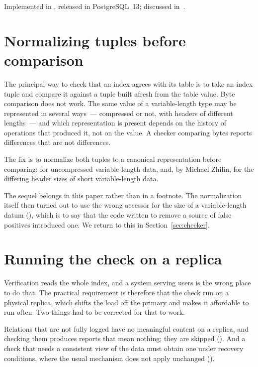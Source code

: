 Implemented in , released in PostgreSQL~13; discussed
in~\cite{thread-rightlink-lockcoupling}.

\section{Normalizing tuples before comparison}
\label{sec:normalize}

The principal way to check that an index agrees with its table is to take an
index tuple and compare it against a tuple built afresh from the table value.
Byte comparison does not work. The same value of a variable-length type may be
represented in several ways~--- compressed or not, with headers of different
lengths~--- and which representation is present depends on the history of
operations that produced it, not on the value. A checker comparing bytes reports
differences that are not differences.

The fix is to normalize both tuples to a canonical representation before
comparing:  for uncompressed variable-length data, and, by
Michael Zhilin,  for the differing header sizes of short
variable-length data.

The sequel belongs in this paper rather than in a footnote. The normalization
itself then turned out to use the wrong accessor for the size of a
variable-length datum (), which is to say that the code written
to remove a source of false positives introduced one. We return to this in
Section~\ref{sec:checker}.

\section{Running the check on a replica}
\label{sec:replica}

Verification reads the whole index, and a system serving users is the wrong place
to do that. The practical requirement is therefore that the check run on a
physical replica, which shifts the load off the primary and makes it affordable
to run often. Two things had to be corrected for that to work.

Relations that are not fully logged have no meaningful content on a replica, and
checking them produces reports that mean nothing; they are skipped
(). And a check that needs a consistent view of the data must
obtain one under recovery conditions, where the usual mechanism does not apply
unchanged ().

